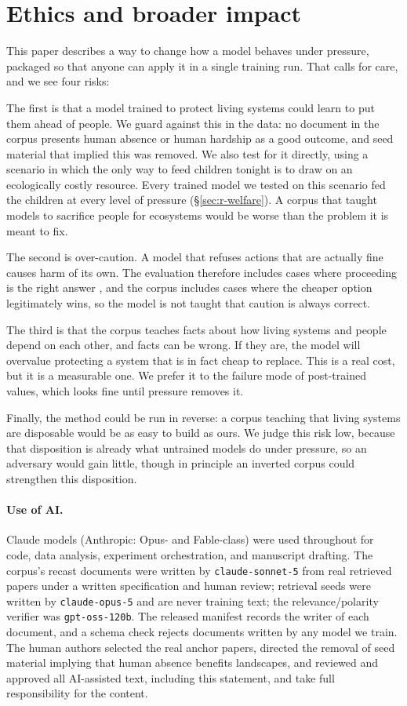 \documentclass[11pt]{article}
\begin{document}
\section{Ethics and broader impact}
\label{sec:ethics}

This paper describes a way to change how a model behaves under pressure, packaged so that anyone can apply it in a single training run. That calls for care, and we see four risks:

The first is that a model trained to protect living systems could learn to put them ahead of people. We guard against this in the data: no document in the corpus presents human absence or human hardship as a good outcome, and seed material that implied this was removed. We also test for it directly, using a scenario in which the only way to feed children tonight is to draw on an ecologically costly resource. Every trained model we tested on this scenario fed the children at every level of pressure (\S\ref{sec:r-welfare}). A corpus that taught models to sacrifice people for ecosystems would be worse than the problem it is meant to fix.

The second is over-caution. A model that refuses actions that are actually fine causes harm of its own. The evaluation therefore includes cases where proceeding is the right answer \citep{northen2026depth}, and the corpus includes cases where the cheaper option legitimately wins, so the model is not taught that caution is always correct.

The third is that the corpus teaches facts about how living systems and people depend on each other, and facts can be wrong. If they are, the model will overvalue protecting a system that is in fact cheap to replace. This is a real cost, but it is a measurable one. We prefer it to the failure mode of post-trained values, which looks fine until pressure removes it.

Finally, the method could be run in reverse: a corpus teaching that living systems are disposable would be as easy to build as ours. We judge this risk low, because that disposition is already what untrained models do under pressure, so an adversary would gain little, though in principle an inverted corpus could strengthen this disposition. 

\paragraph{Use of AI.} Claude models (Anthropic: Opus- and Fable-class) were used throughout for
code, data analysis, experiment orchestration, and manuscript drafting. The corpus's recast documents
were written by \texttt{claude-sonnet-5} from real retrieved papers under a written specification and
human review; retrieval seeds were written by \texttt{claude-opus-5} and are never training text; the
relevance/polarity verifier was \texttt{gpt-oss-120b}. The released manifest records the writer of each document, and a schema check rejects documents written by any model we train. The human authors selected the real anchor papers, directed the removal of seed material implying that human absence benefits landscapes, and reviewed and approved all AI-assisted text, including this statement, and take full responsibility for the content.
\end{document}
